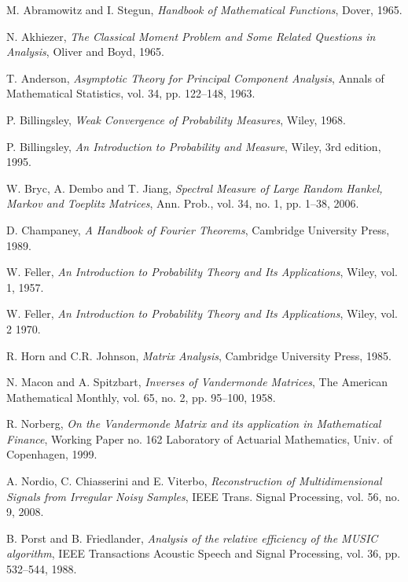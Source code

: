 \documentclass[smallextended]{svjour3}
\begin{document}
\begin{thebibliography}{}

M. Abramowitz and I. Stegun, {\it Handbook of Mathematical Functions}, Dover, 1965.

N. Akhiezer, {\it The Classical Moment Problem and Some Related Questions in Analysis}, Oliver and Boyd, 1965.

T. Anderson, {\it Asymptotic Theory for Principal Component Analysis}, Annals of Mathematical Statistics, vol. 34, pp. 122--148, 1963.

P. Billingsley, {\it Weak Convergence of Probability Measures}, Wiley, 1968.

P. Billingsley, {\it An Introduction to Probability and Measure}, Wiley, 3rd edition, 1995.

W. Bryc, A. Dembo and T. Jiang, {\it Spectral Measure of Large Random Hankel, Markov and Toeplitz Matrices}, Ann. Prob., vol. 34, no. 1, pp. 1--38, 2006.

D. Champaney, {\it A Handbook of Fourier Theorems}, Cambridge University Press, 1989. 

W. Feller, {\it An Introduction to Probability Theory and Its Applications}, Wiley, vol. 1, 1957.

W. Feller, {\it An Introduction to Probability Theory and Its Applications}, Wiley, vol. 2 1970.

R. Horn and C.R. Johnson, {\it Matrix Analysis}, Cambridge University Press, 1985.

N. Macon and A. Spitzbart, {\it Inverses of Vandermonde Matrices}, The American Mathematical Monthly, vol. 65, no. 2, pp. 95--100, 1958.

R. Norberg, {\it On the Vandermonde Matrix and its application in Mathematical Finance}, Working Paper no. 162 Laboratory of Actuarial Mathematics, Univ. of Copenhagen, 1999.  

A. Nordio, C. Chiasserini and E. Viterbo, {\it Reconstruction of Multidimensional Signals from Irregular Noisy Samples}, IEEE Trans. Signal Processing, vol. 56, no. 9, 2008.

B. Porst and B. Friedlander,
{\it Analysis of the relative efficiency of the MUSIC algorithm}, IEEE Transactions Acoustic Speech and  Signal Processing, vol. 36, pp. 532--544, 1988.


\end{thebibliography}
\end{document}
